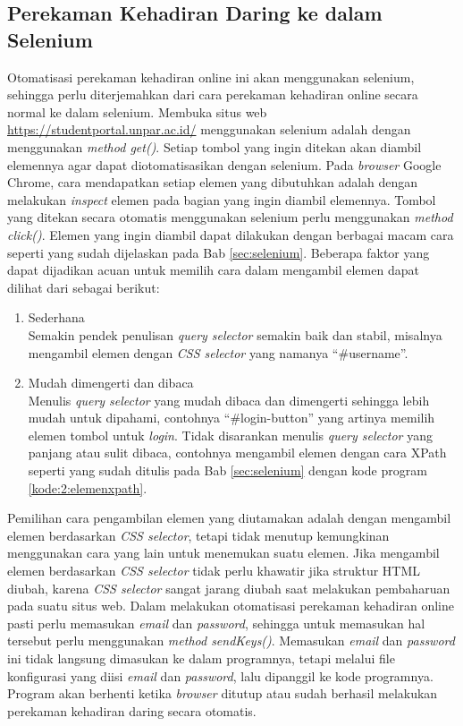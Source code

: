 \subsection{Perekaman Kehadiran Daring ke dalam Selenium}
\label{sec:terjemah} 
Otomatisasi perekaman kehadiran online ini akan menggunakan selenium, sehingga perlu diterjemahkan dari cara perekaman kehadiran online secara normal ke dalam selenium. Membuka situs web \url{https://studentportal.unpar.ac.id/} menggunakan selenium adalah dengan menggunakan \textit{method get()}. Setiap tombol yang ingin ditekan akan diambil elemennya agar dapat diotomatisasikan dengan selenium. Pada \textit{browser} Google Chrome, cara mendapatkan setiap elemen yang dibutuhkan adalah dengan melakukan \textit{inspect} elemen pada bagian yang ingin diambil elemennya. Tombol yang ditekan secara otomatis menggunakan selenium perlu menggunakan \textit{method click()}. Elemen yang ingin diambil dapat dilakukan dengan berbagai macam cara seperti yang sudah dijelaskan pada Bab \ref{sec:selenium}. Beberapa faktor yang dapat dijadikan acuan untuk memilih cara dalam mengambil elemen dapat dilihat dari sebagai berikut:
\begin{enumerate}
	\item Sederhana \\
	Semakin pendek penulisan \textit{query selector} semakin baik dan stabil, misalnya mengambil elemen dengan \textit{CSS selector} yang namanya ``\#username''.
	\item Mudah dimengerti dan dibaca \\
	Menulis \textit{query selector} yang mudah dibaca dan dimengerti sehingga lebih mudah untuk dipahami, contohnya ``\#login-button'' yang artinya memilih elemen tombol untuk \textit{login}. Tidak disarankan menulis \textit{query selector} yang panjang atau sulit dibaca, contohnya mengambil elemen dengan cara XPath seperti yang sudah ditulis pada Bab \ref{sec:selenium} dengan kode program \ref{kode:2:elemenxpath}.
\end{enumerate}
Pemilihan cara pengambilan elemen yang diutamakan adalah dengan mengambil elemen berdasarkan \textit{CSS selector}, tetapi tidak menutup kemungkinan menggunakan cara yang lain untuk menemukan suatu elemen. Jika mengambil elemen berdasarkan \textit{CSS selector} tidak perlu khawatir jika struktur HTML diubah, karena \textit{CSS selector} sangat jarang diubah saat melakukan pembaharuan pada suatu situs web. 
Dalam melakukan otomatisasi perekaman kehadiran online pasti perlu memasukan \textit{email} dan \textit{password}, sehingga untuk memasukan hal tersebut perlu menggunakan \textit{method sendKeys()}. Memasukan \textit{email} dan \textit{password} ini tidak langsung dimasukan ke dalam programnya, tetapi melalui file konfigurasi yang diisi \textit{email} dan \textit{password}, lalu dipanggil ke kode programnya. Program akan berhenti ketika \textit{browser} ditutup atau sudah berhasil melakukan perekaman kehadiran daring secara otomatis.

